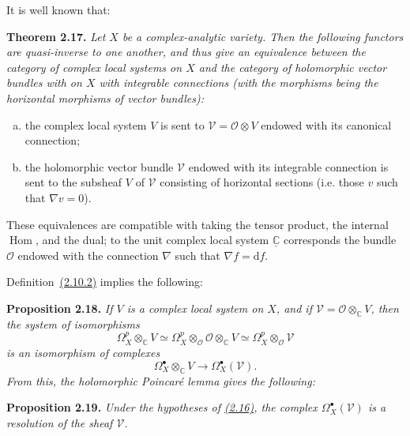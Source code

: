 \documentclass{report}
\newenvironment{itenv}[1]
  {\phantomsection\par\medskip\noindent\textbf{#1.}\itshape}
  {\medskip}
\newcommand{\scr}[1]{{\mathscr{#1}}}
\renewcommand{\cal}[1]{{\mathcal{#1}}}
\newcommand{\CC}{\mathbb{C}}
\newcommand{\dd}{\mathrm{d}}
\DeclareMathOperator{\Hom}{Hom}
\newcommand{\oldpage}[1]{\marginpar{\footnotesize$\Big\vert$ \textit{p.~#1}}}
\begin{document}
It is well known that:
\begin{itenv}{Theorem 2.17}
\label{I.2.17}
  Let $X$ be a complex-analytic variety.
  Then the following functors are quasi-inverse to one another, and thus give an equivalence between the category of complex local systems on $X$ and the category of holomorphic vector bundles with on $X$ with integrable connections (with the morphisms being the horizontal morphisms of vector bundles):
  \begin{enumerate}[a)]
    \item the complex local system $V$ is sent to $\scr{V}=\cal{O}\otimes V$ endowed with its canonical connection;
    \item the holomorphic vector bundle $\scr{V}$ endowed with its integrable connection is sent to the subsheaf $V$ of $\scr{V}$ consisting of horizontal sections (i.e. those $v$ such that $\nabla v=0$).
  \end{enumerate}
\end{itenv}

These equivalences are compatible with taking the tensor product, the internal $\Hom$, and the dual;
to the unit complex local system $\underline{\CC}$ corresponds the bundle $\cal{O}$ endowed with the connection $\nabla$ such that $\nabla f=\dd f$.

Definition~\hyperref[I.2.10.2]{(2.10.2)} implies the following:
\begin{itenv}{Proposition 2.18}
\label{I.2.18}
  If $V$ is a complex local system on $X$, and if $\scr{V}=\cal{O}\otimes_\CC V$,
\oldpage{13}
  then the system of isomorphisms
  \[
    \Omega_X^p\otimes_\CC V
    \simeq
    \Omega_X^p\otimes_\cal{O}\cal{O}\otimes_\CC V
    \simeq
    \Omega_X^p\otimes_\cal{O}\scr{V}
  \]
  is an isomorphism of complexes
  \[
    \Omega_X^\bullet\otimes_\CC V \to \Omega_X^\bullet(\scr{V}).
  \]
\end{itenv}
From this, the holomorphic Poincar\'{e} lemma gives the following:
\begin{itenv}{Proposition 2.19}
\label{I.2.19}
  Under the hypotheses of \hyperref[I.2.16]{(2.16)}, the complex $\Omega_X^\bullet(\scr{V})$ is a resolution of the sheaf $\scr{V}$.
\end{itenv}
\end{document}

